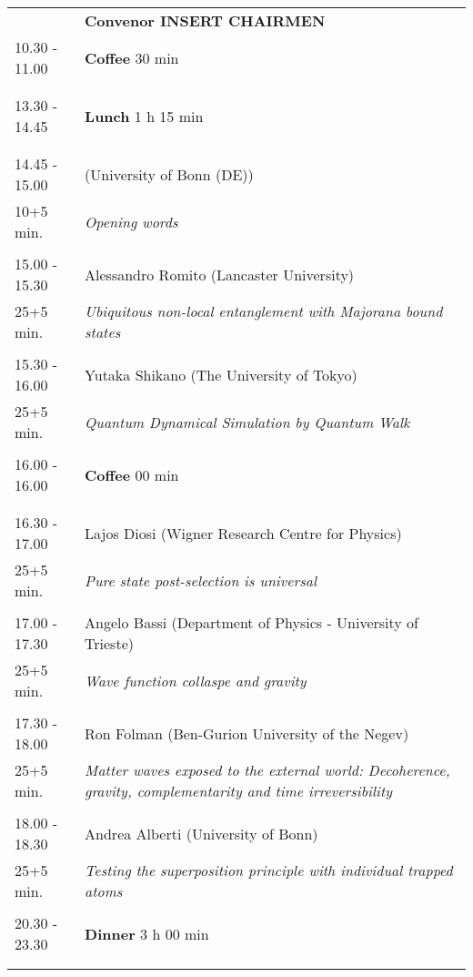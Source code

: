 \begin{longtable}{p{3cm}p{13cm}}
&\hfill {\bf Convenor INSERT CHAIRMEN }\\ 
10.30 - 11.00 & {\bf Coffee} \hfill 30 min \\ 
 & \\ 
 & \\ 
13.30 - 14.45 & {\bf Lunch} \hfill 1 h 15 min \\ 
 & \\ 
 & \\ 
14.45 - 15.00 &  (University of Bonn (DE))\\ 
10+5 min. & {\it Opening words}\\ 
 & \\ 
15.00 - 15.30 & Alessandro Romito (Lancaster University)\\ 
25+5 min. & {\it Ubiquitous non-local entanglement with Majorana bound states}\\ 
 & \\ 
15.30 - 16.00 & Yutaka Shikano (The University of Tokyo)\\ 
25+5 min. & {\it Quantum Dynamical Simulation by Quantum Walk}\\ 
 & \\ 
16.00 - 16.00 & {\bf Coffee} \hfill 00 min \\ 
 & \\ 
 & \\ 
16.30 - 17.00 & Lajos Diosi (Wigner Research Centre for Physics)\\ 
25+5 min. & {\it Pure state post-selection is universal}\\ 
 & \\ 
17.00 - 17.30 & Angelo Bassi (Department of Physics - University of Trieste)\\ 
25+5 min. & {\it Wave function collaspe and gravity}\\ 
 & \\ 
17.30 - 18.00 & Ron Folman (Ben-Gurion University of the Negev)\\ 
25+5 min. & {\it Matter waves exposed to the external world: Decoherence, gravity, complementarity and time irreversibility}\\ 
 & \\ 
18.00 - 18.30 & Andrea Alberti (University of Bonn)\\ 
25+5 min. & {\it Testing the superposition principle with individual trapped atoms}\\ 
 & \\ 
20.30 - 23.30 & {\bf Dinner} \hfill 3 h 00 min \\ 
 & \\ 
 & \\ 
\end{longtable}

